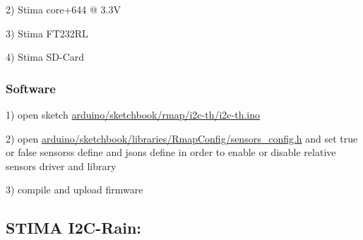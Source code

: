 2) Stima core+644 @ 3.\+3V

3) Stima F\+T232\+RL

4) Stima S\+D-\/\+Card\hypertarget{index_stima_i2c_th_software}{}\subsubsection{Software}\label{index_stima_i2c_th_software}
1) open sketch \hyperlink{i2c-th_8ino}{arduino/sketchbook/rmap/i2c-\/th/i2c-\/th.\+ino}

2) open \hyperlink{sensors__config_8h}{arduino/sketchbook/libraries/\+Rmap\+Config/sensors\+\_\+config.\+h} and set true or false sensors\textquotesingle{}s define and json\textquotesingle{}s define in order to enable or disable relative sensor\textquotesingle{}s driver and library

3) compile and upload firmware\hypertarget{index_i2c-rain}{}\subsection{S\+T\+I\+M\+A I2\+C-\/\+Rain\+:}\label{index_i2c-rain}
 
